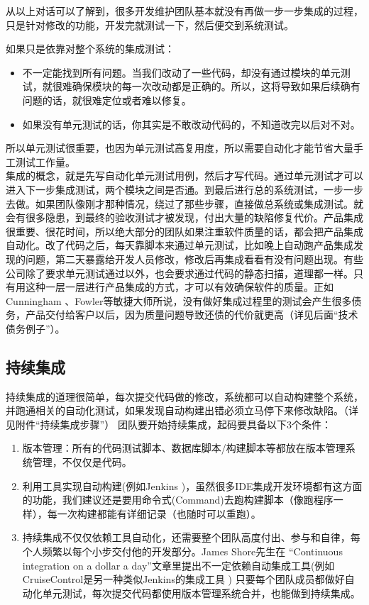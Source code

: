 从以上对话可以了解到，很多开发维护团队基本就没有再做一步一步集成的过程，只是针对修改的功能，开发完就测试一下，然后便交到系统测试。

如果只是依靠对整个系统的集成测试：

\begin{itemize}
\tightlist
\item
  不一定能找到所有问题。当我们改动了一些代码，却没有通过模块的单元测试，就很难确保模块的每一次改动都是正确的。所以，这将导致如果后续确有问题的话，就很难定位或者难以修复。
\item
  如果没有单元测试的话，你其实是不敢改动代码的，不知道改完以后对不对。
\end{itemize}

所以单元测试很重要，也因为单元测试高复用度，所以需要自动化才能节省大量手工测试工作量。\\
集成的概念，就是先写自动化单元测试用例，然后才写代码。通过单元测试才可以进入下一步集成测试，两个模块之间是否通。到最后进行总的系统测试，一步一步去做。如果团队像刚才那种情况，绕过了那些步骤，直接做总系统或集成测试。就会有很多隐患，到最终的验收测试才被发现，付出大量的缺陷修复代价。产品集成很重要、很花时间，所以绝大部分的团队如果注重软件质量的话，都会把产品集成自动化。改了代码之后，每天靠脚本来通过单元测试，比如晚上自动跑产品集成发现的问题，第二天暴露给开发人员修改，修改后再集成看看有没有问题出现。有些公司除了要求单元测试通过以外，也会要求通过代码的静态扫描，道理都一样。只有用这种一层一层进行产品集成的方式，才可以有效确保软件的质量。正如Cunningham 、Fowler等敏捷大师所说，没有做好集成过程里的测试会产生很多债务，产品交付给客户以后，因为质量问题导致还债的代价就更高（详见后面“技术债务例子”）。

\hypertarget{ux6301ux7eedux96c6ux6210}{%
\subsection{持续集成}\label{ux6301ux7eedux96c6ux6210}}

持续集成的道理很简单，每次提交代码做的修改，系统都可以自动构建整个系统，并跑通相关的自动化测试，如果发现自动构建出错必须立马停下来修改缺陷。（详见附件“持续集成步骤”） 团队要开始持续集成，起码要具备以下3个条件：

\begin{enumerate}
\tightlist
\item
  版本管理：所有的代码测试脚本、数据库脚本/构建脚本等都放在版本管理系统管理，不仅仅是代码。
\item
  利用工具实现自动构建(例如Jenkins )，虽然很多IDE集成开发环境都有这方面的功能，我们建议还是要用命令式(Command)去跑构建脚本（像跑程序一样），每一次构建都能有详细记录（也随时可以重跑）。
\item
  持续集成不仅仅依赖工具自动化，还需要整个团队高度付出、参与和自律，每个人频繁以每个小步交付他的开发部分。James Shore先生在 “Continuous integration on a dollar a day”文章里提出不一定依赖自动集成工具(例如CruiseControl是另一种类似Jenkins的集成工具 ) 只要每个团队成员都做好自动化单元测试，每次提交代码都使用版本管理系统合并，也能做到持续集成。
\end{enumerate}


